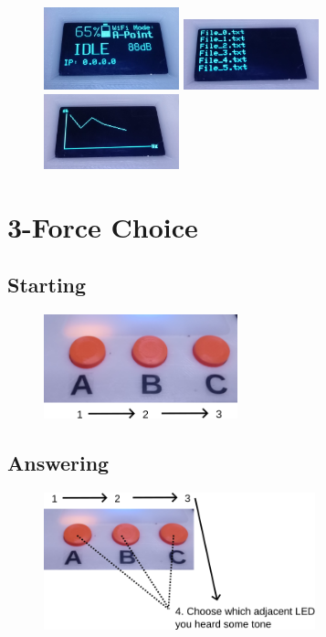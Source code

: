 \documentclass[a4paper,12pt,oneside,pdflatex,italian,final,twocolumn]{article}
\begin{document}
\begin{figure} [h]
    \centering
    \includegraphics[width=0.35\textwidth,]{images/display-home.jpg}
    \includegraphics[width=0.35\textwidth,]{images/display-file.jpg}
    \includegraphics[width=0.35\textwidth,]{images/display-plot.jpg}
\end{figure}

\newpage
\raggedright
\section{3-Force Choice}

\subsection{Starting}

\begin{figure} [h]
    \centering
    \includegraphics[width=0.5\textwidth,]{images/3fc_start.png}
\end{figure}

\subsection{Answering}

\begin{figure} [h]
    \centering
    \includegraphics[width=0.7\textwidth,]{images/3fc_answer.png}
\end{figure}
\end{document}
